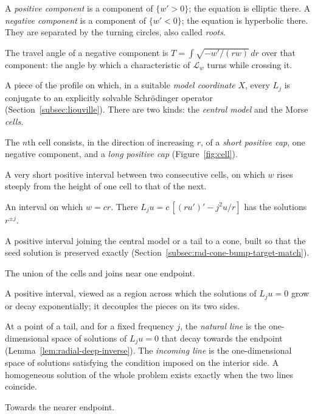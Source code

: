\begin{description}[leftmargin=1.5em,style=sameline,font=\normalfont\itshape]
\item[Positive and negative components.] A \emph{positive component}
 is a component of $\{w'>0\}$; the equation is elliptic there. A
 \emph{negative component} is a component of $\{w'<0\}$; the equation
 is hyperbolic there. They are separated by the turning circles, also
 called \emph{roots}.
\item[Travel angle.] The travel angle of a negative component is
 $T=\int\sqrt{-w'/(rw)}\,dr$ over that component: the angle by which a
 characteristic of $\mathscr L_w$ turns while crossing it.
\item[Model.] A piece of the profile on which, in a suitable
 \emph{model coordinate} $X$, every $L_j$ is conjugate to an
 explicitly solvable Schr\"odinger operator
 (Section~\ref{subsec:liouville}). There are two kinds: the
 \emph{central model} and the Morse \emph{cells}.
\item[Cell.] The $n$th cell consists, in the direction of increasing
 $r$, of a \emph{short positive cap}, one negative component, and a
 \emph{long positive cap} (Figure~\ref{fig:cell}).
\item[Join.] A very short positive interval between two consecutive
 cells, on which $w$ rises steeply from the height of one cell to that
 of the next.
\item[Cone.] An interval on which $w=cr$. There
 $L_ju=c\,[(ru')'-j^2u/r]$ has the solutions $r^{\pm j}$.
\item[Connector.] A positive interval joining the central model or a
 tail to a cone, built so that the seed solution is preserved exactly
 (Section~\ref{subsec:rad-cone-bump-target-match}).
\item[Tail.] The union of the cells and joins near one endpoint.
\item[Buffer.] A positive interval, viewed as a region across which
 the solutions of $L_ju=0$ grow or decay exponentially; it decouples
 the pieces on its two sides.
\item[Natural line, incoming line.] At a point of a tail, and for a
 fixed frequency $j$, the \emph{natural line} is the one-dimensional
 space of solutions of $L_ju=0$ that decay towards the endpoint
 (Lemma~\ref{lem:radial-deep-inverse}). The \emph{incoming line} is
 the one-dimensional space of solutions satisfying the condition
 imposed on the interior side. A homogeneous solution of the whole
 problem exists exactly when the two lines coincide.
\item[Outward.] Towards the nearer endpoint.
\end{description}

